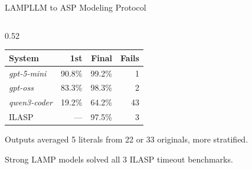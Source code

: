 \documentclass[aspectratio=169,10pt]{beamer}
\begin{document}
\begin{frame}{LAMP\quad LLM to ASP Modeling Protocol}
\begin{columns}[T,onlytextwidth]
\begin{column}{0.52\textwidth}
\vspace{0.5cm}
\centering
\footnotesize
\renewcommand{\arraystretch}{1.05}
\begin{tabular}{@{}lrrr@{}}
\toprule
\textbf{System} & \textbf{1st} & \textbf{Final} & \textbf{Fails} \\
\midrule
\textit{gpt-5-mini}     & 90.8\% & 99.2\% & 1  \\
\textit{gpt-oss}    & 83.3\% & 98.3\% & 2  \\
\textit{qwen3-coder}    & 19.2\% & 64.2\% & 43 \\
ILASP                   & ---    & 97.5\% & 3  \\
\bottomrule
\end{tabular}

\vspace{0.10cm}
{\scriptsize Outputs averaged 5 literals from 22 or 33 originals, more stratified.\par}
{\scriptsize Strong LAMP models solved all 3 ILASP timeout benchmarks.\par}

\end{column}
\end{columns}

\end{frame}
\end{document}
